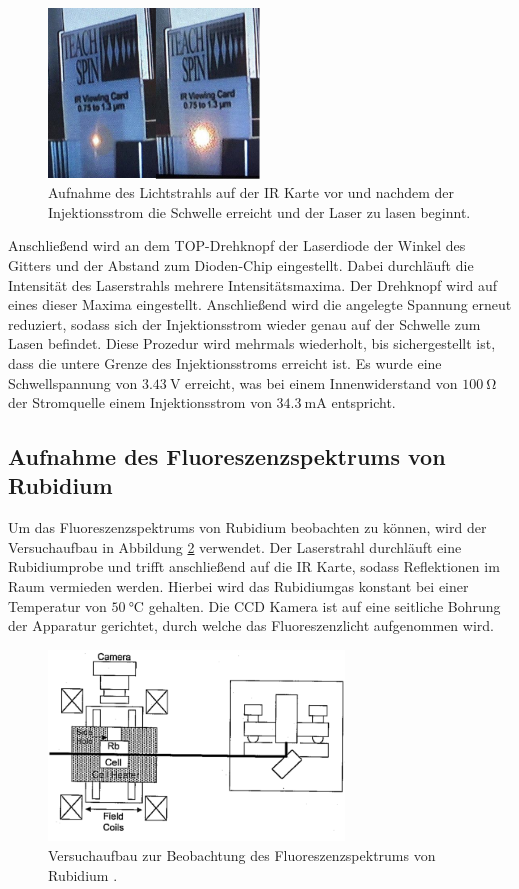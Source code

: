 \begin{figure} 
    \centering
    \includegraphics[width=0.5\textwidth]{pics/Lasen}
    \caption{Aufnahme des Lichtstrahls auf der IR Karte vor und nachdem der Injektionsstrom die Schwelle erreicht und der Laser zu lasen beginnt.}    
    \label{abb:afig2}
\end{figure}

Anschließend wird an dem TOP-Drehknopf der Laserdiode der Winkel des Gitters und der Abstand zum Dioden-Chip eingestellt.
Dabei durchläuft die Intensität des Laserstrahls mehrere Intensitätsmaxima.
Der Drehknopf wird auf eines dieser Maxima eingestellt. 
Anschließend wird die angelegte Spannung erneut reduziert, sodass sich der Injektionsstrom wieder genau auf der Schwelle zum Lasen befindet.
Diese Prozedur wird mehrmals wiederholt, bis sichergestellt ist, dass die untere Grenze des Injektionsstroms erreicht ist.
Es wurde eine Schwellspannung von $\SI{3,43}{\V}$ erreicht, was bei einem Innenwiderstand von $\SI{100}{\ohm}$ der Stromquelle einem Injektionsstrom von $\SI{34,3}{\mA}$ entspricht.

\subsection{Aufnahme des Fluoreszenzspektrums von Rubidium}
Um das Fluoreszenzspektrums von Rubidium beobachten zu können, wird der Versuchaufbau in Abbildung \ref{abb:afig3} verwendet.
Der Laserstrahl durchläuft eine Rubidiumprobe und trifft anschließend auf die IR Karte, sodass Reflektionen im Raum vermieden werden.
Hierbei wird das Rubidiumgas konstant bei einer Temperatur von $\SI{50}{\celsius}$ gehalten.
Die CCD Kamera ist auf eine seitliche Bohrung der Apparatur gerichtet, durch welche das Fluoreszenzlicht aufgenommen wird.

\begin{figure}
    \centering
    \includegraphics[width=0.7\textwidth]{pics/aufbau2}
    \caption{Versuchaufbau zur Beobachtung des Fluoreszenzspektrums von Rubidium \cite{anleitung}.}
    \label{abb:afig3}
\end{figure}

